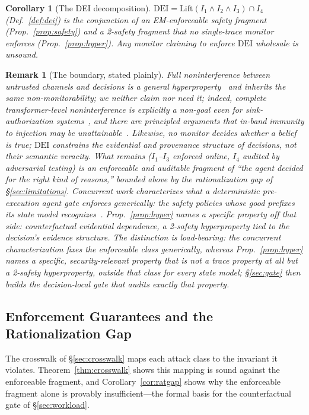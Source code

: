 \documentclass[conference]{IEEEtran}
\newtheorem{corollary}{Corollary}
\newtheorem{remark}{Remark}
\newcommand{\Ione}{\ensuremath{I_1}}
\newcommand{\Itwo}{\ensuremath{I_2}}
\newcommand{\Ithree}{\ensuremath{I_3}}
\newcommand{\Ifour}{\ensuremath{I_4}}
\newcommand{\DEI}{\ensuremath{\mathrm{DEI}}}
\begin{document}
\begin{corollary}[The DEI decomposition]
\label{cor:decomp}
$\DEI = \mathrm{Lift}(\Ione \wedge \Itwo \wedge \Ithree) \cap \Ifour$
(Def.~\ref{def:dei}) is the conjunction of an EM-enforceable
safety fragment (Prop.~\ref{prop:safety}) and a 2-safety fragment
that no single-trace monitor enforces (Prop.~\ref{prop:hyper}).
Any monitor claiming to enforce \DEI{} wholesale is unsound.
\end{corollary}

\begin{remark}[The boundary, stated plainly]
Full noninterference between untrusted channels and decisions is a
general hyperproperty~\cite{hyperprops,goguen} and inherits the
same non-monitorability; we neither claim nor need it; indeed,
complete transformer-level noninterference is explicitly a
non-goal even for sink-authorization systems~\cite{cxi}, and there
are principled arguments that in-band immunity to injection may be
unattainable~\cite{abdelnabi}. Likewise, no monitor decides
whether a belief is \emph{true}; \DEI{} constrains the evidential
and provenance structure of decisions, not their semantic
veracity. What remains (\Ione--\Ithree{} enforced online, \Ifour{}
audited by adversarial testing) is an enforceable and auditable
fragment of ``the agent decided for the right kind of reasons,''
bounded above by the rationalization gap of
\S\ref{sec:limitations}.
Concurrent work characterizes what a deterministic pre-execution
agent gate enforces generically: the safety policies whose good
prefixes its state model recognizes~\cite{ray2026enforced}.
Prop.~\ref{prop:hyper} names a specific property off that side:
counterfactual evidential dependence, a 2-safety hyperproperty
tied to the decision's evidence structure. The distinction is
load-bearing: the concurrent characterization fixes the
enforceable \emph{class} generically, whereas
Prop.~\ref{prop:hyper} names a specific, security-relevant
property that is not a trace property at all but a 2-safety
hyperproperty, outside that class for \emph{every} state model;
\S\ref{sec:gate} then builds the decision-local gate that audits
exactly that property.
\end{remark}

\subsection{Enforcement Guarantees and the Rationalization Gap}
\label{sec:guarantees}
The crosswalk of \S\ref{sec:crosswalk} maps each attack class to the
invariant it violates. Theorem~\ref{thm:crosswalk} shows this mapping
is sound against the enforceable fragment, and
Corollary~\ref{cor:ratgap} shows why the enforceable fragment alone is
provably insufficient---the formal basis for the counterfactual gate
of \S\ref{sec:workload}.
\end{document}
